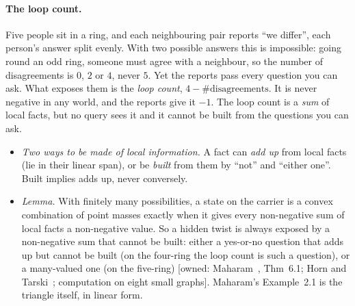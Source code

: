 \documentclass[11pt]{article}
\newcommand{\st}[1]{\textsf{\small[#1]}}
\begin{document}
\paragraph{The loop count.} Five people sit in a ring, and
each neighbouring pair reports ``we differ'', each person's answer split evenly.
With two possible answers this is impossible: going round an odd ring, someone
must agree with a neighbour, so the number of disagreements is $0$, $2$ or $4$,
never $5$. Yet the reports pass every question you can ask. What exposes them is
the \emph{loop count}, $4-\#\text{disagreements}$. It is never negative in any
world, and the reports give it $-1$. The loop count is a \emph{sum} of local
facts, but no query sees it and it cannot be built from the questions you can
ask.
\begin{itemize}[nosep]
  \item \emph{Two ways to be made of local information.} A fact can \emph{add up}
    from local facts (lie in their linear span), or be \emph{built} from them by
    ``not'' and ``either one''. Built implies adds up, never conversely.
  \item \emph{Lemma.} With finitely many possibilities, a state on the carrier is a
    convex combination of point masses exactly when it gives
    every non-negative sum of local facts a non-negative value. So a hidden twist
    is always exposed by a non-negative sum that cannot be built: either a
    yes-or-no question that adds up but cannot be built (on the four-ring the loop
    count is such a question), or a many-valued one (on the five-ring)
    \st{owned: Maharam~\cite{maharam1972}, Thm~6.1; Horn and
    Tarski~\cite{horntarski1948}; computation on eight small graphs}. Maharam's
    Example~2.1 is the triangle itself, in linear form.
\end{itemize}
\end{document}
